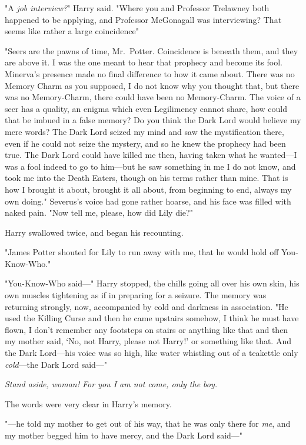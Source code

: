 "A \emph{job interview?}" Harry said. "Where you and Professor Trelawney both
happened to be applying, and Professor McGonagall was interviewing? That
seems{\el} like rather a large coincidence{\el}"

"Seers are the pawns of time, Mr.~Potter. Coincidence is beneath them, and they
are above it. I was the one meant to hear that prophecy and become its fool.
Minerva's presence made no final difference to how it came about. There was no
Memory Charm as you supposed, I do not know why you thought that, but there was
no Memory-Charm, there could have been no Memory-Charm. The voice of a seer has
a quality, an enigma which even Legilimency cannot share, how could that be
imbued in a false memory? Do you think the Dark Lord would believe my mere
words? The Dark Lord seized my mind and saw the mystification there, even if he
could not seize the mystery, and so he knew the prophecy had been true. The
Dark Lord could have killed me then, having taken what he wanted---I was a fool
indeed to go to him---but he saw something in me I do not know, and took me
into the Death Eaters, though on his terms rather than mine. That is how I
brought it about, brought it all about, from beginning to end, always my own
doing." Severus's voice had gone rather hoarse, and his face was filled with
naked pain. "Now tell me, please, how did Lily die?"

Harry swallowed twice, and began his recounting.

"James Potter shouted for Lily to run away with me, that he would hold off
You-Know-Who."

"You-Know-Who said---" Harry stopped, the chills going all over his own skin,
his own muscles tightening as if in preparing for a seizure. The memory was
returning strongly, now, accompanied by cold and darkness in association. "He
used{\el} the Killing Curse{\el} and then he came upstairs somehow, I
think he must have flown, I don't remember any footsteps on stairs or anything
like that{\el} and then my mother said, `No, not Harry, please not Harry!'
or something like that. And the Dark Lord---his voice was so high, like water
whistling out of a teakettle only \emph{cold}---the Dark Lord said---"

\emph{Stand aside, woman! For you I am not come, only the boy.}

The words were very clear in Harry's memory.

"---he told my mother to get out of his way, that he was only there for
\emph{me}, and my mother begged him to have mercy, and the Dark Lord said---"

